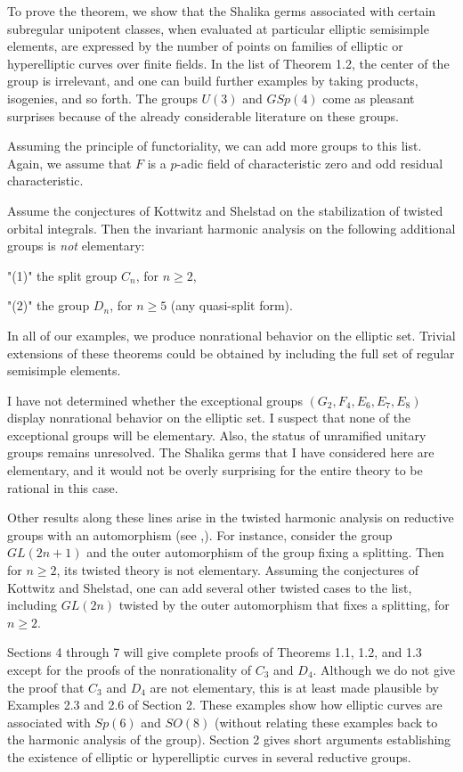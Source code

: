 To prove the theorem, we show that the Shalika germs associated with
certain subregular unipotent classes, when evaluated at particular
elliptic semisimple elements,  are expressed by the number
of points on families of elliptic or
hyperelliptic curves over finite fields.  In the list of Theorem 1.2, 
the center
of the group is irrelevant, and one can build  further
examples by taking products, isogenies, and so forth.
The groups $U(3)$ and $GSp(4)$ come as
pleasant surprises because of the
already considerable literature
on these groups. 

Assuming the principle of
functoriality, we can add more groups to this list.  Again, we assume
that $F$ is a $p$-adic field of characteristic zero and odd
residual characteristic.

Assume the conjectures of Kottwitz
and Shelstad on the stabilization of twisted orbital integrals.
Then the invariant harmonic analysis on the following additional groups
is {\it not} elementary:
\roster
\item"(1)" the split group $C_n$, for $n\ge 2$, 
\item"(2)" the group $D_n$, for $n\ge 5$ (any quasi-split form).
\endroster
\endproclaim

In all of our examples, we produce nonrational behavior
on the elliptic set.  Trivial extensions of these
theorems could be obtained by including the full set
of regular semisimple elements.

I have not determined whether the exceptional groups $(G_2,F_4,E_6,E_7,E_8)$
display nonrational behavior on the elliptic set.  
I suspect that 
none of the exceptional groups will be elementary.  Also,
the status of unramified unitary groups remains 
unresolved.
The Shalika germs that I have considered here are elementary,
and it would not be overly surprising for the entire theory to
be rational in this case.

Other results along these lines arise in 
the twisted harmonic analysis on reductive groups
with an automorphism (see \cite{KS1},\cite{KS2}).
For instance, consider the group $GL(2n+1)$
and the outer automorphism of the group fixing a splitting.  
Then for $n\ge 2$, its
twisted theory is not elementary.  Assuming the conjectures
of Kottwitz and Shelstad, one can add 
several other twisted cases to the list, including
$GL(2n)$ twisted by the
outer automorphism that fixes a splitting, for $n\ge 2$.

Sections 4 through 7 will give complete proofs of Theorems 1.1, 1.2, and 1.3
except for the proofs of the nonrationality of $C_3$ and $D_4$.
Although we do not give the proof that $C_3$ and $D_4$ are not
elementary, this is at least made plausible by Examples 2.3 and 2.6
of Section 2.  These examples show how elliptic curves are associated
with $Sp(6)$ and $SO(8)$ (without relating these examples back to
the harmonic analysis of the group).  
  Section 2
gives short arguments establishing the existence of elliptic
or hyperelliptic
curves in several reductive groups.

